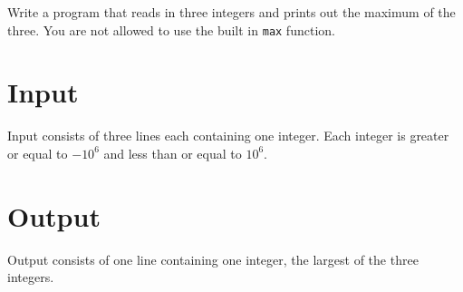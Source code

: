 
Write a program that reads in three integers and prints out the maximum of the three. You are not allowed to use the built in \texttt{max} function.

\section*{Input}
Input consists of three lines each containing one integer. Each integer is greater or equal to $-10^6$ and less than or equal to $10^6$.

\section*{Output}
Output consists of one line containing one integer, the largest of the three integers.

